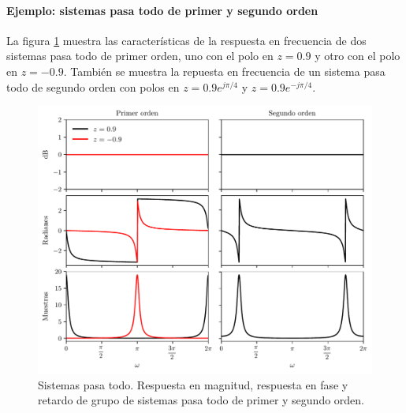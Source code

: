 \documentclass[a4paper]{report}
\begin{document}
\paragraph{Ejemplo: sistemas pasa todo de primer y segundo orden} La figura \ref{fig:transform_analysis_all_pass_first_second_order} muestra las características de la respuesta en frecuencia de dos sistemas pasa todo de primer orden, uno con el polo en \(z=0.9\) y otro con el polo en \(z=-0.9\). También se muestra la repuesta en frecuencia de un sistema pasa todo de segundo orden con polos en \(z=0.9e^{j\pi/4}\) y \(z=0.9e^{-j\pi/4}\).
\begin{figure}[!htb]
 \begin{center}
 \includegraphics[width=1\textwidth]{figuras/transform_analysis_all_pass_first_second_order.pdf}
 \caption{\label{fig:transform_analysis_all_pass_first_second_order} Sistemas pasa todo. Respuesta en magnitud, respuesta en fase y retardo de grupo de sistemas pasa todo de primer y segundo orden.}
 \end{center}
\end{figure}
\end{document}
